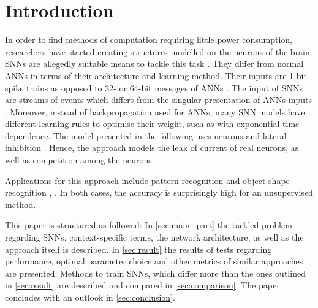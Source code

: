 \section{Introduction}

In order to find methods of computation requiring little power consumption, 
researchers have started creating structures modelled on the neurons of the brain.
\acp{SNN} are allegedly suitable means to tackle this task \cite{SNN}.
They differ from normal \acp{ANN} in terms of their architecture and learning method.
Their inputs are 1-bit spike trains as opposed to 32- or 64-bit messages of \acp{ANN} \cite{SNN}.
The input of \acp{SNN} are streams of events which differs from the singular presentation of \acp{ANN} inputs \cite{ANN_SNN_conversion}.
Moreover, instead of backpropagation used for \acp{ANN}, many \ac{SNN} models have different learning rules to optimise their weight, 
such as  with exponential time dependence.
The model presented in the following uses  neurons and lateral inhibition \cite{SNN}.
Hence, the approach models the leak of current of real neurons, as well as competition among the neurons.

Applications for this approach include pattern recognition \cite{SNN} and object shape recognition \cite{object_detection_SNN}, \cite{multi_scale_STDP}.
In both cases, the accuracy is surprisingly high for an unsupervised method.

This paper is structured as followed:
In \autoref{sec:main_part} the tackled problem regarding \acp{SNN}, context-specific terms, the network architecture,
 as well as the approach itself is described.
In \autoref{sec:result} the results of tests regarding performance, optimal parameter choice and other metrics of similar approaches are presented.
Methods to train \acp{SNN}, which differ more than the ones outlined in \autoref{sec:result} are described and compared in \autoref{sec:comparison}.
The paper concludes with an outlook in \autoref{sec:conclusion}.